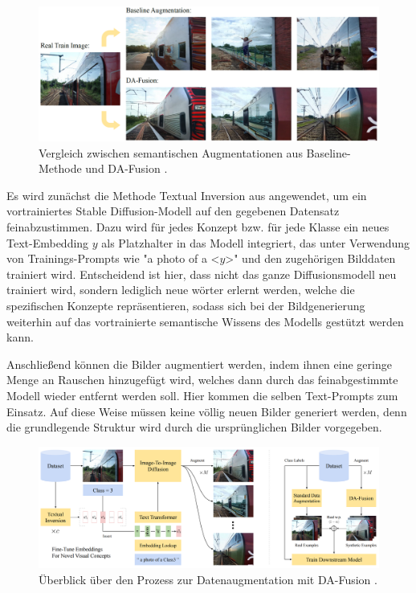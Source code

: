 \begin{figure}[h]
	\centering
	\includegraphics[width=\textwidth]{figure_da-fusion_vs_baseline.png}
	\caption{Vergleich zwischen semantischen Augmentationen aus Baseline-Methode und DA-Fusion \parencite{Trabucco2023dafusion}.}
	\label{fig:da-fusion}
\end{figure}

Es wird zunächst die Methode Textual Inversion aus \parencite{Gal2022textualinversion} angewendet, um ein vortrainiertes Stable Diffusion-Modell auf den gegebenen Datensatz feinabzustimmen. Dazu wird für jedes Konzept bzw. für jede Klasse ein neues Text-Embedding $y$ als Platzhalter in das Modell integriert, das unter Verwendung von Trainings-Prompts wie "a photo of a <$y$>" und den zugehörigen Bilddaten trainiert wird. Entscheidend ist hier, dass nicht das ganze Diffusionsmodell neu trainiert wird, sondern lediglich neue wörter erlernt werden, welche die spezifischen Konzepte repräsentieren, sodass sich bei der Bildgenerierung weiterhin auf das vortrainierte semantische Wissens des Modells gestützt werden kann.

Anschließend können die Bilder augmentiert werden, indem ihnen eine geringe Menge an Rauschen hinzugefügt wird, welches dann durch das feinabgestimmte Modell wieder entfernt werden soll. Hier kommen die selben Text-Prompts zum Einsatz. Auf diese Weise müssen keine völlig neuen Bilder generiert werden, denn die grundlegende Struktur wird durch die ursprünglichen Bilder vorgegeben.

\begin{figure}
	\centering
	\includegraphics[width=\textwidth]{figure_da-fusion_architecture.png}
	\caption{Überblick über den Prozess zur Datenaugmentation mit DA-Fusion \parencite{Trabucco2023dafusion}.}
	\label{fig:da-fusion-process}
\end{figure}

